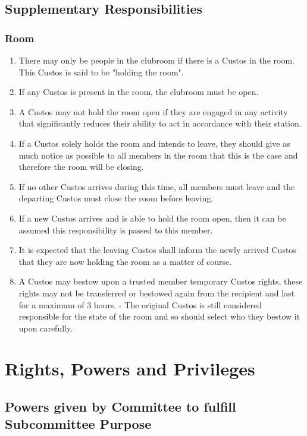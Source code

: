 \documentclass[10pt,a4paper]{report}
\begin{document}
		\section{Supplementary Responsibilities}
			\subsection{Room}
			\begin{enumerate}
				\item There may only be people in the clubroom if there is a Custos in the room. This Custos is said to be "holding the room".
				\item If any Custos is present in the room, the clubroom must be open.
				\item A Custos may not hold the room open if they are engaged in any activity that significantly reduces their ability to act in accordance with their station.
				\item If a Custos solely holds the room and intends to leave, they should give as much notice as possible to all members in the room that this is the case and therefore the room will be closing.
				\item If no other Custos arrives during this time, all members must leave and the departing Custos must close the room before leaving.
				\item If a new Custos arrives and is able to hold the room open, then it can be assumed this responsibility is passed to this member.
				\item It is expected that the leaving Custos shall inform the newly arrived Custos that they are now holding the room as a matter of course.
				\item A Custos may bestow upon a trusted member temporary Custos rights, these rights may not be transferred or bestowed again from the recipient and last for a maximum of 3 hours. - The original Custos is still considered responsible for the state of the room and so should select who they bestow it upon carefully.
			\end{enumerate}
			
	\chapter{Rights, Powers and Privileges}
		\section{Powers given by Committee to fulfill Subcommittee Purpose}
		
\end{document}

